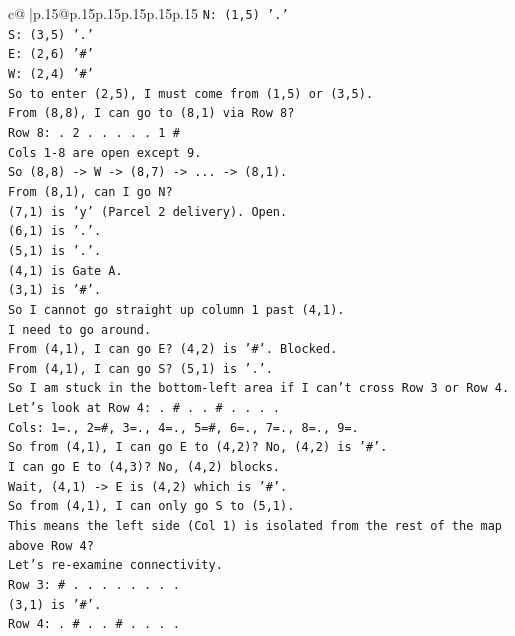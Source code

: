 \documentclass{article}
\begin{document}
{\begin{supertabular}{c@{$\;$}|p{.15\linewidth}@{}p{.15\linewidth}p{.15\linewidth}p{.15\linewidth}p{.15\linewidth}p{.15\linewidth}}
{{{\texttt{N: (1,5) '.'} \\
\texttt{S: (3,5) '.'} \\
\texttt{E: (2,6) '\#'} \\
\texttt{W: (2,4) '\#'} \\
\texttt{So to enter (2,5), I must come from (1,5) or (3,5).} \\
\texttt{From (8,8), I can go to (8,1) via Row 8?} \\
\texttt{Row 8: . 2 . . . . . 1 \#} \\
\texttt{Cols 1{-}8 are open except 9.} \\
\texttt{So (8,8) {-}> W {-}> (8,7) {-}> ... {-}> (8,1).} \\
\texttt{From (8,1), can I go N?} \\
\texttt{(7,1) is 'y' (Parcel 2 delivery). Open.} \\
\texttt{(6,1) is '.'.} \\
\texttt{(5,1) is '.'.} \\
\texttt{(4,1) is Gate A.} \\
\texttt{(3,1) is '\#'.} \\
\texttt{So I cannot go straight up column 1 past (4,1).} \\
\texttt{I need to go around.} \\
\texttt{From (4,1), I can go E? (4,2) is '\#'. Blocked.} \\
\texttt{From (4,1), I can go S? (5,1) is '.'.} \\
\texttt{So I am stuck in the bottom{-}left area if I can't cross Row 3 or Row 4.} \\
\texttt{Let's look at Row 4: . \# . . \# . . . .} \\
\texttt{Cols: 1=., 2=\#, 3=., 4=., 5=\#, 6=., 7=., 8=., 9=.} \\
\texttt{So from (4,1), I can go E to (4,2)? No, (4,2) is '\#'.} \\
\texttt{I can go E to (4,3)? No, (4,2) blocks.} \\
\texttt{Wait, (4,1) {-}> E is (4,2) which is '\#'.} \\
\texttt{So from (4,1), I can only go S to (5,1).} \\
\texttt{This means the left side (Col 1) is isolated from the rest of the map above Row 4?} \\
\texttt{Let's re{-}examine connectivity.} \\
\texttt{Row 3: \# . . . . . . . .} \\
\texttt{(3,1) is '\#'.} \\
\texttt{Row 4: . \# . . \# . . . .} \\
}}}
\end{supertabular}}
\end{document}
